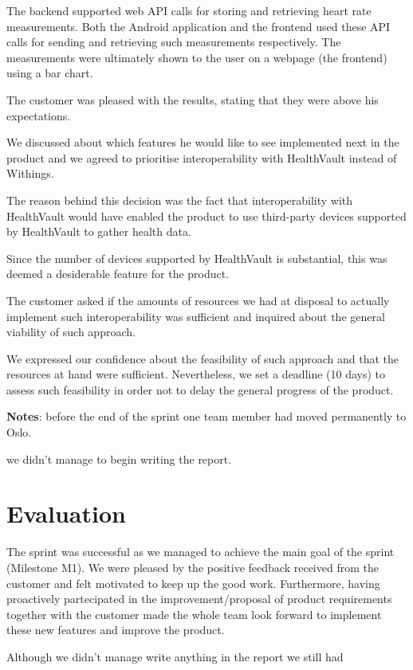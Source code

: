 The backend supported web API calls for storing and retrieving heart rate measurements.
Both the Android application and the frontend used these API calls for sending and retrieving
such measurements respectively. The measurements were ultimately shown to the user on a
webpage (the frontend) using a bar chart.

The customer was pleased with the results, stating that they were above his expectations.

We discussed about which features he would like to see implemented next in the product
and we agreed to prioritise interoperability with HealthVault instead of Withings.

The reason behind this decision was the fact that interoperability with HealthVault would have
enabled the product to use third-party devices supported by HealthVault to gather health data.

Since the number of devices supported by HealthVault is substantial, this was deemed a
desiderable feature for the product.

The customer asked if the amounts of resources we had at disposal to actually implement
such interoperability was sufficient and inquired about the general viability of such approach.

We expressed our confidence about the feasibility of such approach and that the resources
at hand were sufficient. Nevertheless, we set a deadline (10 days) to assess such
feasibility in order not to delay the general progress of the product.

\textbf{Notes}: before the end of the sprint one team member had moved permanently to Oslo.

we didn't manage to begin writing the report.

\section{Evaluation}

The sprint was successful as we managed to achieve the main goal of the sprint (Milestone M1).
We were pleased by the positive feedback received from the customer and felt motivated to keep up the good work.
Furthermore, having proactively partecipated in the improvement/proposal of product requirements
together with the customer made the whole team look forward to implement these new features and improve the product.

Although we didn't manage write anything in the report we still had